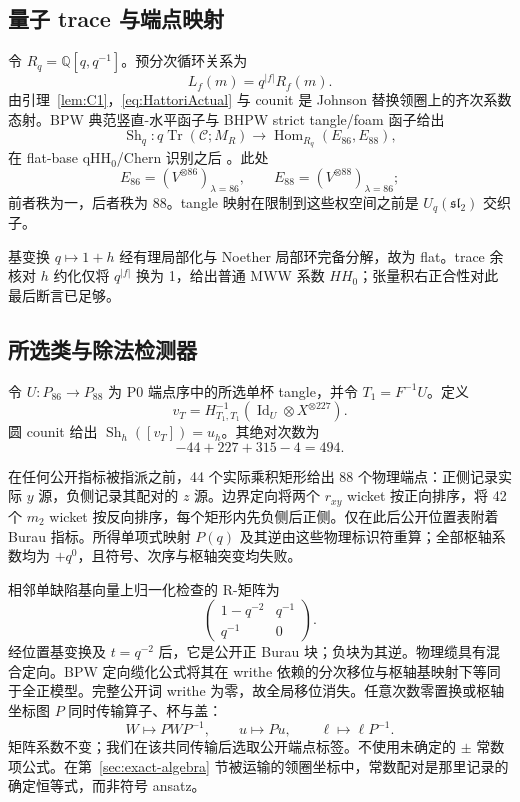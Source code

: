 \documentclass[11pt]{amsart}
\theoremstyle{definition}
\theoremstyle{remark}
\newcommand{\Q}{\mathbb{Q}}
\begin{document}
\subsection{量子 trace 与端点映射}

令 $R_q=\Q[q,q^{-1}]$。预分次循环关系为
\[
L_f(m)=q^{|f|}R_f(m).
\]
由引理~\ref{lem:C1}，\eqref{eq:HattoriActual} 与 counit 是 Johnson 替换领圈上的齐次系数态射。BPW 典范竖直-水平函子与 BHPW strict tangle/foam 函子给出
\begin{equation}\label{eq:actualShadow}
\operatorname{Sh}_q:q\operatorname{Tr}(\mathcal C;M_R)
\longrightarrow\operatorname{Hom}_{R_q}(E_{86},E_{88}),
\end{equation}
在 flat-base qHH$_0$/Chern 识别之后
\cite{BeliakovaPutyraWehrli2019,BeliakovaHogancampPutyraWehrli2023}。此处
\[
E_{86}=(V^{\otimes86})_{\lambda=86},\qquad
E_{88}=(V^{\otimes88})_{\lambda=86};
\]
前者秩为一，后者秩为 88。tangle 映射在限制到这些权空间之前是 $U_q(\mathfrak{sl}_2)$ 交织子。

基变换 $q\mapsto1+h$ 经有理局部化与 Noether 局部环完备分解，故为 flat。trace 余核对 $h$ 约化仅将 $q^{|f|}$ 换为 1，给出普通 MWW 系数 $HH_0$；张量积右正合性对此最后断言已足够。

\subsection{所选类与除法检测器}

令 $U:P_{86}\to P_{88}$ 为 P0 端点序中的所选单杯 tangle，并令 $T_1=F^{-1}U$。定义
\[
v_T=H_{T_1,T_1}^{-1}
  (\operatorname{Id}_U\otimes X^{\otimes227}).
\]
圆 counit 给出
$\operatorname{Sh}_h([v_T])=u_h$。其绝对次数为
\[
-44+227+315-4=494.
\]

在任何公开指标被指派之前，44 个实际乘积矩形给出
88 个物理端点：正侧记录实际 $y$ 源，负侧记录其配对的 $z$ 源。边界定向将两个
$r_{xy}$ wicket 按正向排序，将 42 个 $m_2$ wicket 按反向排序，每个矩形内先负侧后正侧。仅在此后公开位置表附着 Burau 指标。所得单项式映射 $P(q)$ 及其逆由这些物理标识符重算；全部枢轴系数均为
$+q^0$，且符号、次序与枢轴突变均失败。

相邻单缺陷基向量上归一化检查的 R-矩阵为
\[
\begin{pmatrix}1-q^{-2}&q^{-1}\\q^{-1}&0\end{pmatrix}.
\]
经位置基变换及 $t=q^{-2}$ 后，它是公开正 Burau 块；负块为其逆。物理缆具有混合定向。BPW 定向缆化公式将其在 writhe 依赖的分次移位与枢轴基映射下等同于全正模型。完整公开词 writhe 为零，故全局移位消失。任意次数零置换或枢轴坐标图 $P$ 同时传输算子、杯与盖：
\[
W\mapsto PWP^{-1},\qquad u\mapsto Pu,\qquad
\ell\mapsto\ell P^{-1}.
\]
矩阵系数不变；我们在该共同传输后选取公开端点标签。不使用未确定的 $\pm$ 常数项公式。在第~\ref{sec:exact-algebra} 节被运输的领圈坐标中，常数配对是那里记录的确定恒等式，而非符号 ansatz。
\end{document}

